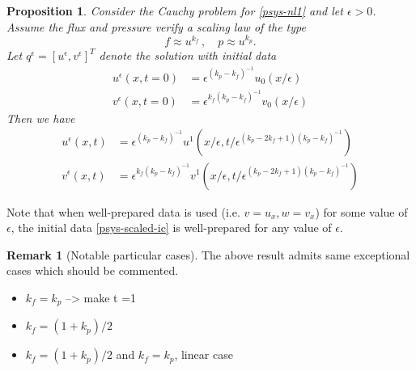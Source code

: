 \documentclass{article}
\theoremstyle{plain}
\newtheorem{proposition}[theorem]{Proposition}
\theoremstyle{definition}
\newtheorem{remark}[theorem]{Remark}
\numberwithin{theorem}{section}
\newcommand{\todo}[1]{{\Large{\color{red}{#1}}}}
\begin{document}
\begin{proposition}
Consider   the Cauchy problem for \eqref{psys-nl1} and  let $\epsilon>0$.
Assume the flux and pressure verify a scaling law   of the type 
$$
f  \approx u^{k_f}\,,\quad p \approx u^{k_p}.
$$
Let $q^\epsilon=[u^\epsilon,v^\epsilon]^T$ denote the
solution   with initial data
\begin{subequations} \label{psys-scaled-ic}
\begin{align}
    u^\epsilon(x,t=0) & = \epsilon^{(k_p - k_f)^{-1}} u_0(x/\epsilon) \\
    v^\epsilon(x,t=0) & = \epsilon^{k_f(k_p - k_f)^{-1}} v_0(x/\epsilon)
\end{align}
\end{subequations}
Then we have
\begin{subequations} \label{psys-scaled-ic-2}
\begin{align}
    u^{\epsilon}(x,t) & = \epsilon^{(k_p - k_f)^{-1}} u^1(x/\epsilon, t/\epsilon^{(k_p - 2k_f  + 1) (k_p - k_f)^{-1} } ) \\
    v^{\epsilon}(x,t) & =  \epsilon^{k_f(k_p - k_f)^{-1}} v^1(x/\epsilon, t/\epsilon^{(k_p - 2k_f  + 1) (k_p - k_f)^{-1} } )
\end{align}
\end{subequations}
\end{proposition}
Note that when well-prepared data is used (i.e. $v=u_x, w = v_x$) for some value of
$\epsilon$, the initial data \eqref{psys-scaled-ic} is well-prepared for any value of $\epsilon$.


\begin{remark}[Notable particular cases] The above result  admits same exceptional cases which should be commented.
\begin{itemize}
\item $k_f=k_p$ --> make t =1
\item  $k_f=(1+k_p)/2$  
\item  $k_f=(1+k_p)/2$ and $k_f=k_p$, linear case
\end{itemize}
\end{remark}

\todo{COmplete remark: case 1 need to make $n_t$ = 1 and revert the scaling with $x$ not scaling. case 2:  does not scale. case 3: no interest. }
\end{document}

